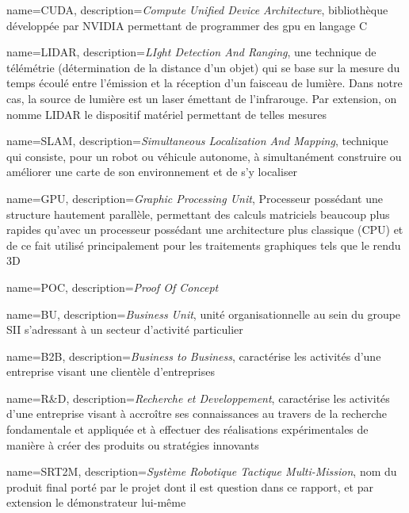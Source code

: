 {
	name={CUDA},
	description={\emph{Compute Unified Device Architecture}, bibliothèque développée par NVIDIA permettant de programmer des \gls{gpu} en langage C}
}


{
	name={LIDAR},
	description={\emph{LIght Detection And Ranging}, une technique de télémétrie (détermination de la distance d'un objet) qui se base sur la mesure du temps écoulé entre l'émission et la réception d'un faisceau de lumière. Dans notre cas, la source de lumière est un laser émettant de l'infrarouge. Par extension, on nomme LIDAR le dispositif matériel permettant de telles mesures}
}

{
	name={SLAM},
	description={\emph{Simultaneous Localization And Mapping}, technique qui consiste, pour un robot ou véhicule autonome, à simultanément construire ou améliorer une carte de son environnement et de s’y localiser}
}

{
	name={GPU},
	description={\emph{Graphic Processing Unit}, Processeur possédant une structure hautement parallèle, permettant des calculs matriciels beaucoup plus rapides qu'avec un processeur possédant une architecture plus classique (CPU) et de ce fait utilisé principalement pour les traitements graphiques tels que le rendu 3D}
}

{
	name={POC},
	description={\emph{Proof Of Concept}}
}

{
	name={BU},
	description={\emph{Business Unit}, unité organisationnelle au sein du groupe SII s'adressant à un secteur d'activité particulier}
}

{
	name={B2B},
	description={\emph{Business to Business}, caractérise les activités d'une entreprise visant une clientèle d'entreprises}
}

{
	name={R\&D},
	description={\emph{Recherche et Developpement}, caractérise les activités d'une entreprise visant à accroître ses connaissances au travers de la recherche fondamentale et appliquée et à effectuer des réalisations expérimentales de manière à créer des produits ou stratégies innovants}
}

{
	name={SRT2M},
	description={\emph{Système Robotique Tactique Multi-Mission}, nom du produit final porté par le projet dont il est question dans ce rapport, et par extension le démonstrateur lui-même}
}
